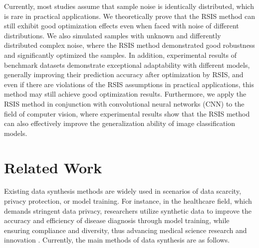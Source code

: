 \documentclass[final,3p,times]{elsarticle}
\begin{document}
Currently, most studies assume that sample noise is identically 
distributed, which is rare in practical applications. We theoretically 
prove that the RSIS method can still exhibit good optimization 
effects even when faced with noise of different distributions. We 
also simulated samples with unknown and differently distributed 
complex noise, where the RSIS method demonstrated good robustness 
and significantly optimized the samples. In addition, experimental 
results of benchmark datasets demonstrate exceptional adaptability 
with different models, generally improving their prediction accuracy 
after optimization by RSIS, and even if there are violations of the 
RSIS assumptions in practical applications, this method may still 
achieve good optimization results. Furthermore, we apply the RSIS 
method in conjunction with convolutional neural networks (CNN) to 
the field of computer vision, where experimental results show that 
the RSIS method can also effectively improve the generalization 
ability of image classification models. 





\section{Related Work}
{\color{myred}Existing data synthesis methods are widely used in 
scenarios of data scarcity, privacy protection, or model training. 
For instance, in the healthcare field, which demands stringent data 
privacy, researchers utilize synthetic data to improve the accuracy 
and efficiency of disease diagnosis through model training, while 
ensuring compliance and diversity, thus advancing medical science 
research and innovation \cite{bib17,bib18}. Currently, the main methods of data 
synthesis are as follows.}
\end{document}
